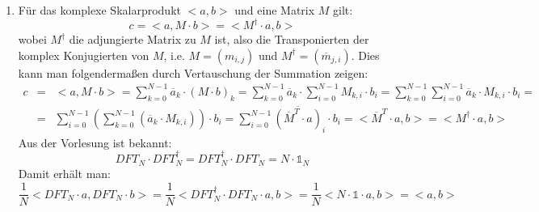 \begin{enumerate}[1.]
	\item Für das komplexe Skalarprodukt $<a, b>$ und eine Matrix $M$ gilt:
	\[ c = <a, M \cdot b> = < M^\dagger \cdot a, b> \]
	wobei $M^\dagger$ die adjungierte Matrix zu $M$ ist, also die Transponierten der komplex Konjugierten von $M$,
	i.e. $M = (m_{i,j})$ und $M^\dagger = (\overline{m}_{j,i})$.
	Dies kann man folgendermaßen durch Vertauschung der Summation zeigen:
	\begin{eqnarray*}
	c &=& <a, M \cdot b> = \sum_{k=0}^{N-1} \overline{a}_k \cdot \left( M \cdot b \right)_k =
	\sum_{k=0}^{N-1} \overline{a}_k \cdot \sum_{i=0}^{N-1} M_{k,i} \cdot b_i =
	\sum_{k=0}^{N-1} \sum_{i=0}^{N-1} \overline{a}_k \cdot M_{k,i} \cdot b_i = \\
	&=& \sum_{i=0}^{N-1} \left( \sum_{k=0}^{N-1} \left( \overline{a}_k \cdot M_{k,i}\right) \right) \cdot b_i =
	\sum_{i=0}^{N-1} \overline{\left( \overline{M}^T \cdot a \right)}_i \cdot b_i = <\overline{M}^T \cdot a, b> = <M^\dagger \cdot a, b>
	\end{eqnarray*}
	Aus der Vorlesung ist bekannt: 
	\[ DFT_N \cdot DFT_N^\dagger = DFT_N^\dagger \cdot DFT_N = N \cdot \mathds{1}_N \]
	Damit erhält man:
	\[ \frac{1}{N} < DFT_N \cdot a, DFT_N \cdot b> =
	\frac{1}{N} < DFT_N^\dagger \cdot DFT_N \cdot a, b > =
	\frac{1}{N} < N \cdot \mathds{1}\cdot a, b> = < a, b> \]
\end{enumerate}
